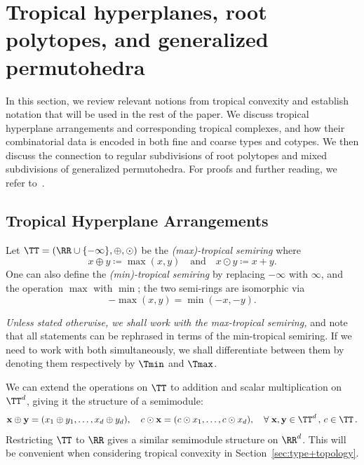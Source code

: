 \section{Tropical hyperplanes, root polytopes, and generalized permutohedra}\label{sec: arrangements}
In this section, we review relevant notions from tropical convexity and establish notation that will be used in the rest of the paper.  We discuss tropical hyperplane arrangements and corresponding tropical complexes, and how their combinatorial data is encoded in both fine and coarse types and cotypes. We then discuss the connection to regular subdivisions of root polytopes and mixed subdivisions of generalized permutohedra.
For proofs and further reading, we refer to~\cite{JoswigBook22}.

\label{sec:background}

\subsection{Tropical Hyperplane Arrangements}
\phantom{}

\begin{definition}\label{def: tropicalSemiRing}
Let $\TT = (\RR\cup \{-\infty\},\oplus, \odot)$ be the \emph{(max)-tropical semiring} where
$$
x\oplus y \coloneqq \max(x,y) \quad \text{and} \quad x\odot y \coloneqq x+y.
$$
One can also define the \emph{(min)-tropical semiring} by replacing $-\infty$ with $\infty$, and the operation $\max$ with $\min$; the two semi-rings are isomorphic via
$$
-\max(x,y) = \min(-x,-y).
$$
\end{definition}
\textit{Unless stated otherwise, we shall work with the max-tropical semiring,} and note that all statements can be rephrased in terms of the min-tropical semiring.
If we need to work with both simultaneously, we shall differentiate between them by denoting them respectively by $\Tmin$ and $\Tmax$.

We can extend the operations on $\TT$ to addition and scalar multiplication on $\TT^d$, giving it the structure of a semimodule:
\begin{align*}
{\bf x} \oplus {\bf y} = (x_1 \oplus y_1, \dots, x_d \oplus y_d), \quad c \odot {\bf x} = (c \odot x_1, \dots, c \odot x_d), \quad \forall \; {\bf x}, {\bf y} \in \TT^d \, , \, c \in \TT \, .
\end{align*}
Restricting $\TT$ to $\RR$ gives a similar semimodule structure on $\RR^d$.
This will be convenient when considering tropical convexity in Section~\ref{sec:type+topology}.

